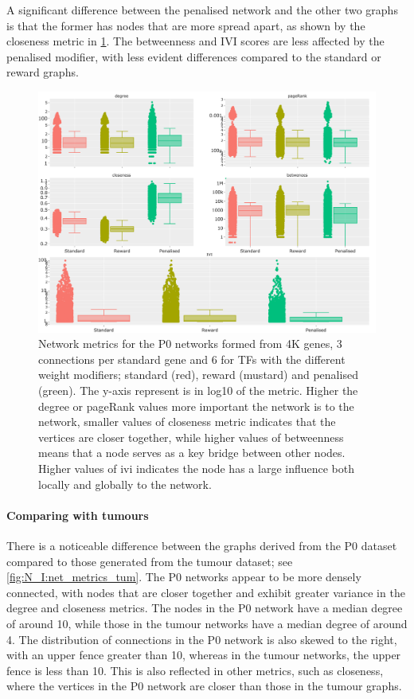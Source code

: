 A significant difference between the penalised network and the other two graphs is that the former has nodes that are more spread apart, as shown by the closeness metric in \cref{fig:N_I:net_metrics_p0}. The betweenness and IVI scores are less affected by the penalised modifier, with less evident differences compared to the standard or reward graphs.


\begin{figure}[!t]    
    \centering
    \includegraphics[width=1.0\textwidth,keepaspectratio]{Sections/Network_I/Resources/P0/P0_NetworkMetricsComp_50TF_2.png}
     \caption{Network metrics for the P0 networks formed from 4K genes, 3 connections per standard gene and 6 for TFs with the different weight modifiers; standard (red), reward (mustard) and penalised (green). The y-axis represent is in log10 of the metric. Higher the degree or pageRank values more important the network is to the network, smaller values of closeness metric indicates that the vertices are closer together, while higher values of betweenness means that a node serves as a key bridge between other nodes. Higher values of \acrfull{ivi} indicates the node has a large influence both locally and globally to the network.}
    \label{fig:N_I:net_metrics_p0}
\end{figure}


\paragraph*{Comparing with tumours }

There is a noticeable difference between the graphs derived from the P0 dataset compared to those generated from the tumour dataset; see \cref{fig:N_I:net_metrics_tum}. The P0 networks appear to be more densely connected, with nodes that are closer together and exhibit greater variance in the degree and closeness metrics. The nodes in the P0 network have a median degree of around 10, while those in the tumour networks have a median degree of around 4. The distribution of connections in the P0 network is also skewed to the right, with an upper fence greater than 10, whereas in the tumour networks, the upper fence is less than 10. This is also reflected in other metrics, such as closeness, where the vertices in the P0 network are closer than those in the tumour graphs.

